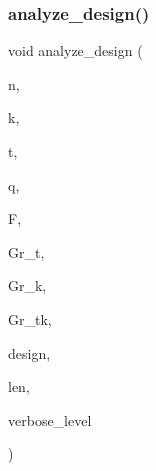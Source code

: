 \subsubsection{\texorpdfstring{analyze\+\_\+design()}{analyze\_design()}}
{\footnotesize\ttfamily void analyze\+\_\+design (\begin{DoxyParamCaption}\item[{\mbox{\hyperlink{galois_8h_a09fddde158a3a20bd2dcadb609de11dc}{I\+NT}}}]{n,  }\item[{\mbox{\hyperlink{galois_8h_a09fddde158a3a20bd2dcadb609de11dc}{I\+NT}}}]{k,  }\item[{\mbox{\hyperlink{galois_8h_a09fddde158a3a20bd2dcadb609de11dc}{I\+NT}}}]{t,  }\item[{\mbox{\hyperlink{galois_8h_a09fddde158a3a20bd2dcadb609de11dc}{I\+NT}}}]{q,  }\item[{\mbox{\hyperlink{classfinite__field}{finite\+\_\+field}} $\ast$}]{F,  }\item[{\mbox{\hyperlink{classgrassmann}{grassmann}} $\ast$}]{Gr\+\_\+t,  }\item[{\mbox{\hyperlink{classgrassmann}{grassmann}} $\ast$}]{Gr\+\_\+k,  }\item[{\mbox{\hyperlink{classgrassmann}{grassmann}} $\ast$}]{Gr\+\_\+tk,  }\item[{\mbox{\hyperlink{galois_8h_a09fddde158a3a20bd2dcadb609de11dc}{I\+NT}} $\ast$}]{design,  }\item[{\mbox{\hyperlink{galois_8h_a09fddde158a3a20bd2dcadb609de11dc}{I\+NT}}}]{len,  }\item[{\mbox{\hyperlink{galois_8h_a09fddde158a3a20bd2dcadb609de11dc}{I\+NT}}}]{verbose\+\_\+level }\end{DoxyParamCaption})}

\mbox{\label{analyze__q__designs_8_c_a56bc4112debc1d923d24db2bdc86374a}} 
